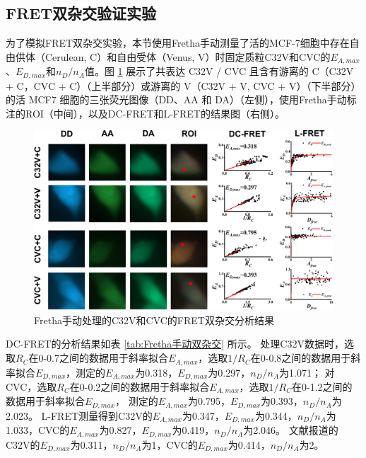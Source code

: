 \subsection{FRET双杂交验证实验}
\label{sec:模型质粒FRET双杂交验证实验}

为了模拟FRET双杂交实验，本节使用Fretha手动测量了活的MCF-7细胞中存在自由供体（Cerulean, C）和自由受体（Venus, V）时固定质粒C32V和CVC的$E_{A,max}$、$E_{D,max}$和$n_D/n_A$值。图 \ref{fig:Fretha手动双杂交} 展示了共表达 C32V / CVC 且含有游离的 C（C32V + C，CVC + C）（上半部分）或游离的 V（C32V + V, CVC + V）（下半部分）的活 MCF7 细胞的三张荧光图像（DD、AA 和 DA）（左侧），使用Fretha手动标注的ROI（中间），以及DC-FRET和L-FRET的结果图（右侧）。
\begin{figure}
  \centering
  \includegraphics[width=1\linewidth]{../figures/3/验证-手动双杂交结果.drawio.png}
  \caption{Fretha手动处理的C32V和CVC的FRET双杂交分析结果}
  \label{fig:Fretha手动双杂交}
\end{figure}

DC-FRET的分析结果如表 \ref{tab:Fretha手动双杂交} 所示。
处理C32V数据时，选取$R_C$在0-0.7之间的数据用于斜率拟合$E_{A,max}$，选取$1/R_C$在0-0.8之间的数据用于斜率拟合$E_{D,max}$，测定的$E_{A,max}$为0.318，$E_{D,max}$为0.297，$n_D/n_A$为1.071；
对CVC，选取$R_C$在0-0.2之间的数据用于斜率拟合$E_{A,max}$，选取$1/R_C$在0-1.2之间的数据用于斜率拟合$E_{D,max}$，
测定的$E_{A,max}$为0.795，$E_{D,max}$为0.393，$n_D/n_A$为2.023。
L-FRET测量得到C32V的$E_{A,max}$为0.347，$E_{D,max}$为0.344，$n_D/n_A$为1.033，CVC的$E_{A,max}$为0.827，$E_{D,max}$为0.419，$n_D/n_A$为2.046。
文献报道的C32V的$E_{D,max}$为0.311，$n_D/n_A$为1，CVC的$E_{D,max}$为0.414，$n_D/n_A$为2。


